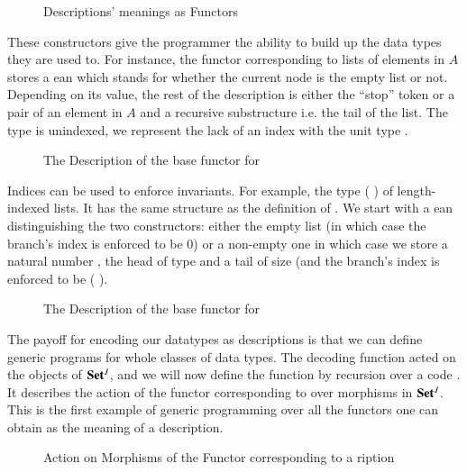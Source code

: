 \begin{figure}[h]
\caption{Descriptions' meanings as Functors\label{fig:datadescmeaning}}
\end{figure}

These constructors give the programmer the ability to build up the data
types they are used to. For instance, the functor corresponding
to lists of elements in $A$ stores a ean which stands for whether
the current node is the empty list or not. Depending on its value, the
rest of the description is either the ``stop'' token or a pair of an element
in $A$ and a recursive substructure i.e. the tail of the list. The  type
is unindexed, we represent the lack of an index with the unit type \AD{$\top$}.

\begin{figure}[h]
\caption{The Description of the base functor for  }\label{figure:listD}
\end{figure}

Indices can be used to enforce invariants. For example, the type ({  })
of length-indexed lists. It has the same structure as the definition of .
We start with a ean distinguishing the two constructors: either
the empty list (in which case the branch's index is enforced to be $0$) or a
non-empty one in which case we store a natural number , the head of type
 and a tail of size  (and the branch's index is enforced to be
( ).

\begin{figure}[h]
\caption{The Description of the base functor for   }\label{figure:vecD}
\end{figure}

The payoff for encoding our datatypes as descriptions is that we can
define generic programs for whole classes of data types. The decoding
function  acted on the objects of $\mathbf{Set}{}^J$, and we will now
define the function  by recursion over a code .
It describes the action of the functor corresponding to  over
morphisms in $\mathbf{Set}{}^J$. This is the first example of generic
programming over all the functors one can obtain as the meaning
of a description.

\begin{figure}[h]
\caption{Action on Morphisms of the Functor corresponding to a ription\label{fig:fmapD}}
\end{figure}

